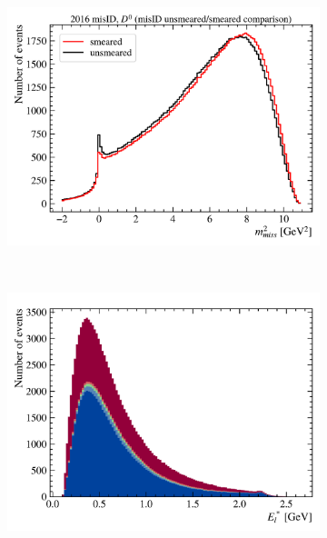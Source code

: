 \begin{figure}[!htb]
    \hfill
    \begin{subfigure}[b]{0.32\textwidth}
        \centering
        \includegraphics[width=\textwidth]{figs-fit-fit-templates/data-driven-plots/misid/D0_mm2_comp.pdf}
    \end{subfigure}
    \\
    \begin{subfigure}[b]{0.32\textwidth}
        \centering
        \includegraphics[width=\textwidth]{figs-fit-fit-templates/data-driven-plots/misid/D0_el.pdf}
    \end{subfigure}
    \hfill
    \begin{subfigure}[b]{0.32\textwidth}
        \centering

\end{subfigure}
\end{figure}
